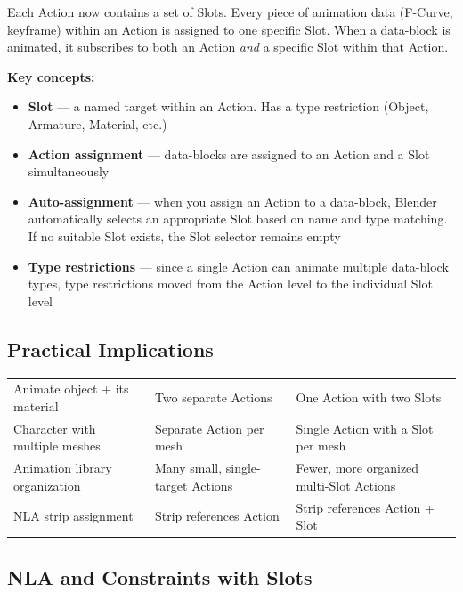 Each Action now contains a set of Slots. Every piece of animation data (F-Curve, keyframe) within an Action is assigned to one specific Slot. When a data-block is animated, it subscribes to both an Action \textit{and} a specific Slot within that Action.

\textbf{Key concepts:}

\begin{itemize}[leftmargin=2em]
  \item \textbf{Slot} --- a named target within an Action. Has a type restriction (Object, Armature, Material, etc.)
  \item \textbf{Action assignment} --- data-blocks are assigned to an Action and a Slot simultaneously
  \item \textbf{Auto-assignment} --- when you assign an Action to a data-block, Blender automatically selects an appropriate Slot based on name and type matching. If no suitable Slot exists, the Slot selector remains empty
  \item \textbf{Type restrictions} --- since a single Action can animate multiple data-block types, type restrictions moved from the Action level to the individual Slot level
\end{itemize}

\subsection{Practical Implications}

\begin{center}
\begin{tabularx}{\textwidth}{L{3cm}L{4cm}X}
\toprule
{}
 &  &  \\
\midrule
Animate object + its material & Two separate Actions & One Action with two Slots \\
Character with multiple meshes & Separate Action per mesh & Single Action with a Slot per mesh \\
Animation library organization & Many small, single-target Actions & Fewer, more organized multi-Slot Actions \\
NLA strip assignment & Strip references Action & Strip references Action + Slot \\
\bottomrule
\end{tabularx}
\end{center}

\subsection{NLA and Constraints with Slots}


